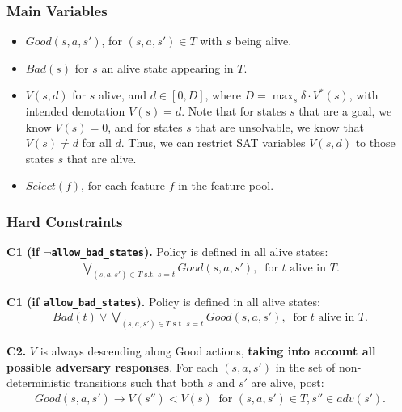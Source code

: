 \documentclass[a4paper]{article}
\newcommand{\smallpar}[1]{{\vspace{10pt}\noindent \bf #1.}}
\newcommand{\badtx}{\ensuremath{\mathrm{BAD}}}
\begin{document}
\subsubsection{Main Variables}

\begin{itemize}
 \item $Good(s, a, s')$, for $(s, a, s') \in T$ with $s$ being alive.

 \item $Bad(s)$ for $s$ an alive state appearing in $T$.


 \item $V(s, d)$ for $s$ alive, and $d \in [0, D]$, where $D = \max_{s} \delta \cdot V^*(s)$,
 with intended denotation $V(s)=d$.
 Note that for states $s$ that are a goal, we know $V(s)=0$,
 and for states $s$ that are unsolvable, we know that $V(s) \neq d$ for all $d$.
 Thus, we can restrict SAT variables $V(s, d)$ to those states $s$ that are alive.

 \item $Select(f)$, for each feature $f$ in the feature pool.
\end{itemize}


\subsubsection{Hard Constraints}

\smallpar{C1 (if $\neg$\texttt{allow\_bad\_states})}
Policy is defined in all alive states:
\begin{align*}
\bigvee_{(s, a, s') \in T \text{ s.t. } s=t} Good(s, a, s'), \;\; \text{for $t$ alive in $T$.}
\end{align*}

\smallpar{C1 (if \texttt{allow\_bad\_states})}
Policy is defined in all alive states:
\begin{align*}
Bad(t) \lor \bigvee_{(s, a, s') \in T \text{ s.t. } s=t} Good(s, a, s'), \;\; \text{for $t$ alive in $T$.}
\end{align*}

\smallpar{C2} $V$ is always descending along Good actions, \textbf{taking into account all possible adversary responses}.
For each $(s, a, s')$ in the set of non-deterministic transitions
such that both $s$ and $s'$ are alive, post:
\begin{align*}
Good(s, a, s') \rightarrow V(s'') < V(s)  \;\; \text{for } (s, a, s') \in T,  s'' \in adv(s').
\end{align*}
\end{document}
